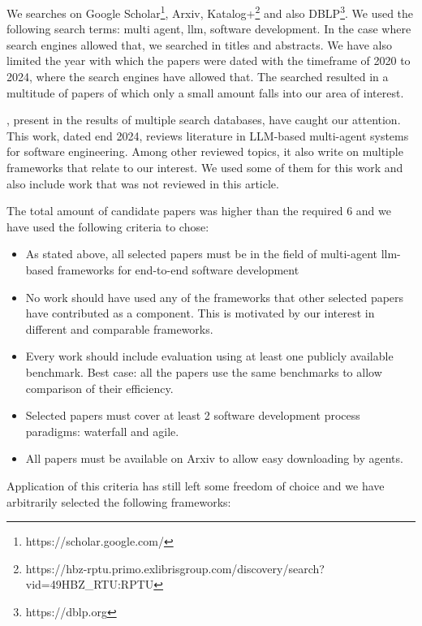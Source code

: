 We searches on Google Scholar\footnote{https://scholar.google.com/}, Arxiv, Katalog+\footnote{https://hbz-rptu.primo.exlibrisgroup.com/discovery/search?vid=49HBZ\_RTU:RPTU} and also DBLP\footnote{https://dblp.org}. We used the following search terms: multi agent, llm, software development. In the case where search engines allowed that, we searched in titles and abstracts. We have also limited the year with which the papers were dated with the timeframe of 2020 to 2024, where the search engines have allowed that. The searched resulted in a multitude of papers of which only a small amount falls into our area of interest. 

\cite{he2024llm}, present in the results of multiple search databases, have caught our attention. This work, dated end 2024, reviews literature in LLM-based multi-agent systems for software engineering. Among other reviewed topics, it also write on multiple frameworks that relate to our interest. We used some of them for this work and also include work that was not reviewed in this article.


The total amount of candidate papers was higher than the required 6 and we have used the following criteria to chose:

\begin{itemize}
	
	\item As stated above, all selected papers must be in the field of multi-agent llm-based frameworks for end-to-end software development 	 
	\item No work should have used any of the frameworks that other selected papers have contributed as a component. This is motivated by our interest in different and comparable frameworks.
	\item Every work should include evaluation using at least one publicly available benchmark. Best case: all the papers use the same benchmarks to allow comparison of their efficiency.
	\item Selected papers must cover at least 2 software development process paradigms: waterfall and agile.
	\item All papers must be available on Arxiv to allow easy downloading by agents.
\end{itemize}

Application of this criteria has still left some freedom of choice and we have arbitrarily selected the following frameworks:


